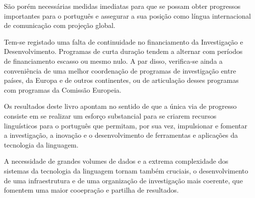 \begin{multicols}{2}
São porém necessárias medidas imediatas para que se possam obter progressos importantes
para o português e assegurar a sua posição como língua internacional de comunicação com projeção global.



Tem-se registado uma falta de continuidade no financiamento da Investigação e Desenvolvimento. 
Programas de curta duração tendem a alternar com períodos de financiamento escasso ou mesmo nulo.
A par disso, verifica-se ainda a conveniência de uma melhor coordenação de programas de investigação
entre países, da Europa e de outros continentes, ou de articulação desses programas com programas 
da Comissão Europeia.

Os resultados deste livro apontam no sentido de que a única via de progresso consiste em se realizar um esforço substancial 
para se criarem recursos linguísticos para o português que permitam, por sua vez, impulsionar 
e fomentar a investigação, a inovação e o desenvolvimento de ferramentas e aplicações da tecnologia da linguagem. 

A necessidade de grandes volumes de dados e a extrema complexidade dos sistemas da tecnologia da linguagem 
tornam também cruciais, o desenvolvimento de uma infraestrutura e de uma organização de investigação mais coerente, 
que fomentem uma maior cooepração e partilha de resultados.



\end{multicols}

\cleardoublepage



